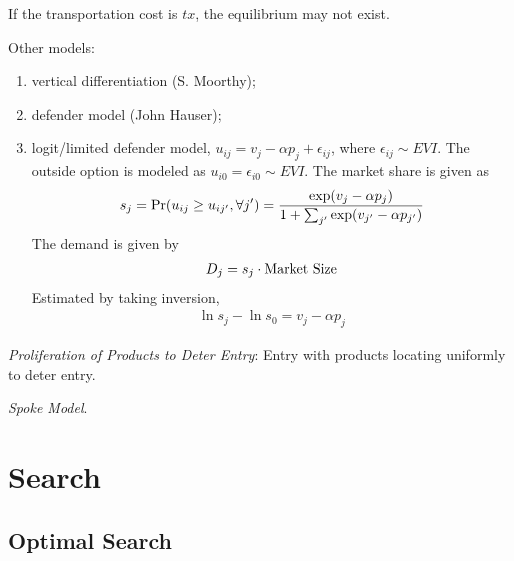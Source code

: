 \documentclass[11pt]{elegantbook}
\begin{document}
\begin{note}
    If the transportation cost is $tx$, the equilibrium may not exist.
\end{note}


Other models:
\begin{enumerate}
    \item vertical differentiation (S. Moorthy);
    \item defender model (John Hauser);
    \item logit/limited defender model, $u_{ij}=v_j - \alpha p_j+\epsilon_{ij}$, where $\epsilon_{ij}\sim EVI$. The outside option is modeled as $u_{i0}=\epsilon_{i0}\sim EVI$. The market share is given as
    \begin{equation}
        \begin{aligned}
            s_{j}=\textnormal{Pr}(u_{ij}\geq u_{ij'},\forall j')=\frac{\exp(v_j - \alpha p_j)}{1+\sum_{j'}\exp(v_{j'}-\alpha p_{j'})}
        \end{aligned}
        \nonumber
    \end{equation}
    The demand is given by
    \begin{equation}
        \begin{aligned}
            D_j=s_j\cdot \textnormal{Market Size}
        \end{aligned}
        \nonumber
    \end{equation}
    Estimated by taking inversion,
    \begin{equation}
        \begin{aligned}
            \ln s_j - \ln s_0 = v_j - \alpha p_j
        \end{aligned}
        \nonumber
    \end{equation}
\end{enumerate}

\textit{Proliferation of Products to Deter Entry}: Entry with products locating uniformly to deter entry.

\textit{Spoke Model}.


\chapter{Search}
\section{Optimal Search}
\end{document}
